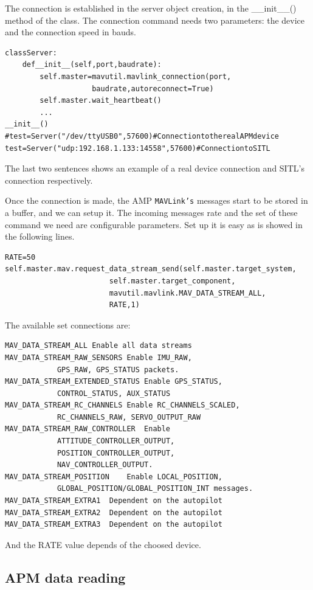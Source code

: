 The connection is established in the server object creation, in the \_\_init\_\_() method of the class. The connection command needs two parameters: the device and the connection speed in bauds.
{\scriptsize
\begin{lstlisting}
classServer:
	def__init__(self,port,baudrate):
		self.master=mavutil.mavlink_connection(port,
					baudrate,autoreconnect=True)
		self.master.wait_heartbeat()
		...
__init__()
#test=Server("/dev/ttyUSB0",57600)#ConnectiontotherealAPMdevice
test=Server("udp:192.168.1.133:14558",57600)#ConnectiontoSITL
\end{lstlisting}}

The last two sentences shows an example of a real device connection and SITL's connection respectively.

Once the connection is made, the AMP \texttt{MAVLink's} messages start to be stored in a buffer, and we can setup it. The incoming messages rate and the set of these command we need are configurable parameters. Set up it is easy as is showed in the following lines.

{\scriptsize
\begin{lstlisting}
RATE=50
self.master.mav.request_data_stream_send(self.master.target_system,
						self.master.target_component,
						mavutil.mavlink.MAV_DATA_STREAM_ALL,
						RATE,1)
\end{lstlisting}}

The available set connections are:

\begin{verbatim}
MAV_DATA_STREAM_ALL	Enable all data streams
MAV_DATA_STREAM_RAW_SENSORS	Enable IMU_RAW, 
	        GPS_RAW, GPS_STATUS packets.
MAV_DATA_STREAM_EXTENDED_STATUS	Enable GPS_STATUS, 
	        CONTROL_STATUS, AUX_STATUS
MAV_DATA_STREAM_RC_CHANNELS	Enable RC_CHANNELS_SCALED,
	        RC_CHANNELS_RAW, SERVO_OUTPUT_RAW
MAV_DATA_STREAM_RAW_CONTROLLER	Enable 
	        ATTITUDE_CONTROLLER_OUTPUT, 
	        POSITION_CONTROLLER_OUTPUT, 
	        NAV_CONTROLLER_OUTPUT.
MAV_DATA_STREAM_POSITION	Enable LOCAL_POSITION, 
	        GLOBAL_POSITION/GLOBAL_POSITION_INT messages.
MAV_DATA_STREAM_EXTRA1	Dependent on the autopilot
MAV_DATA_STREAM_EXTRA2	Dependent on the autopilot
MAV_DATA_STREAM_EXTRA3	Dependent on the autopilot

\end{verbatim}

And the RATE value depends of the choosed device.


\subsection{APM data reading}
\label{subsec:apm_data_reading}


